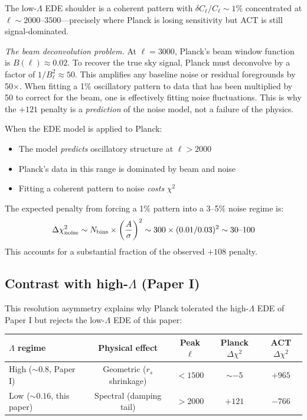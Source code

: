 \documentclass[twocolumn,showpacs,preprintnumbers,amsmath,amssymb,prd]{revtex4-2}
\begin{document}
The low-$\Lambda$ EDE shoulder is a coherent pattern with $\delta C_\ell / C_\ell 
\sim 1\%$ concentrated at $\ell \sim 2000$--$3500$---precisely where Planck is 
losing sensitivity but ACT is still signal-dominated.

\emph{The beam deconvolution problem.} At $\ell = 3000$, Planck's beam window 
function is $B(\ell) \approx 0.02$. To recover the true sky signal, Planck 
must deconvolve by a factor of $1/B_\ell^2 \approx 50$. This amplifies any 
baseline noise or residual foregrounds by 50$\times$. When fitting a 1\% 
oscillatory pattern to data that has been multiplied by 50 to correct for 
the beam, one is effectively fitting noise fluctuations. This is why the 
$+121$ penalty is a \emph{prediction} of the noise model, not a failure of 
the physics.

When the EDE model is applied to Planck:
\begin{itemize}
\item The model \emph{predicts} oscillatory structure at $\ell > 2000$
\item Planck's data in this range is dominated by beam and noise
\item Fitting a coherent pattern to noise \emph{costs} $\chi^2$
\end{itemize}

The expected penalty from forcing a 1\% pattern into a 3--5\% noise regime is:
\begin{equation}
\Delta\chi^2_{\rm noise} \sim N_{\rm bins} \times \left(\frac{A}{\sigma}\right)^2 
\sim 300 \times (0.01/0.03)^2 \sim 30\text{--}100
\end{equation}
This accounts for a substantial fraction of the observed $+108$ penalty.

\subsection{Contrast with high-$\Lambda$ (Paper I)}

This resolution asymmetry explains why Planck tolerated the high-$\Lambda$ EDE 
of Paper I but rejects the low-$\Lambda$ EDE of this paper:
\begin{center}
\begin{tabular}{lcccc}
\toprule
$\Lambda$ regime & Physical effect & Peak $\ell$ & Planck $\Delta\chi^2$ & ACT $\Delta\chi^2$ \\
\midrule
High ($\sim 0.8$, Paper I) & Geometric ($r_s$ shrinkage) & $<1500$ & $\sim -5$ & $+965$ \\
Low ($\sim 0.16$, this paper) & Spectral (damping tail) & $>2000$ & $+121$ & $-766$ \\
\bottomrule
\end{tabular}
\end{center}
\end{document}
